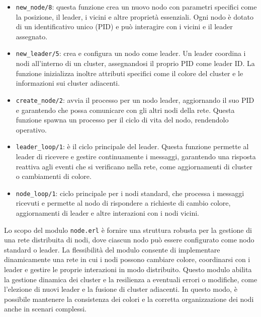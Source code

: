 \documentclass[12pt, a4paper]{report}
\begin{document}
\begin{itemize}
    \item \texttt{new\_node/8}: questa funzione crea un nuovo nodo con parametri specifici come la posizione, il leader, i vicini e altre proprietà essenziali. Ogni nodo \`e dotato di un identificativo unico (PID) e può interagire con i vicini e il leader assegnato.

    \item \texttt{new\_leader/5}: crea e configura un nodo come leader. Un leader coordina i nodi all'interno di un cluster, assegnandosi il proprio PID come leader ID. La funzione inizializza inoltre attributi specifici come il colore del cluster e le informazioni sui cluster adiacenti.

    \item \texttt{create\_node/2}: avvia il processo per un nodo leader, aggiornando il suo PID e garantendo che possa comunicare con gli altri nodi della rete. Questa funzione spawna un processo per il ciclo di vita del nodo, rendendolo operativo.

    \item \texttt{leader\_loop/1}: \`e il ciclo principale del leader. Questa funzione permette al leader di ricevere e gestire continuamente i messaggi, garantendo una risposta reattiva agli eventi che si verificano nella rete, come aggiornamenti di cluster o cambiamenti di colore.

    \item \texttt{node\_loop/1}: ciclo principale per i nodi standard, che processa i messaggi ricevuti e permette al nodo di rispondere a richieste di cambio colore, aggiornamenti di leader e altre interazioni con i nodi vicini.

\end{itemize}

\noindent
Lo scopo del modulo \texttt{node.erl} \`e fornire una struttura robusta per la gestione di una rete distribuita di nodi, dove ciascun nodo può essere configurato come nodo standard o leader. La flessibilità del modulo consente di implementare dinamicamente una rete in cui i nodi possono cambiare colore, coordinarsi con i leader e gestire le proprie interazioni in modo distribuito. Questo modulo abilita la gestione dinamica dei cluster e la resilienza a eventuali errori o modifiche, come l'elezione di nuovi leader e la fusione di cluster adiacenti. In questo modo, \`e possibile mantenere la consistenza dei colori e la corretta organizzazione dei nodi anche in scenari complessi.
\end{document}

